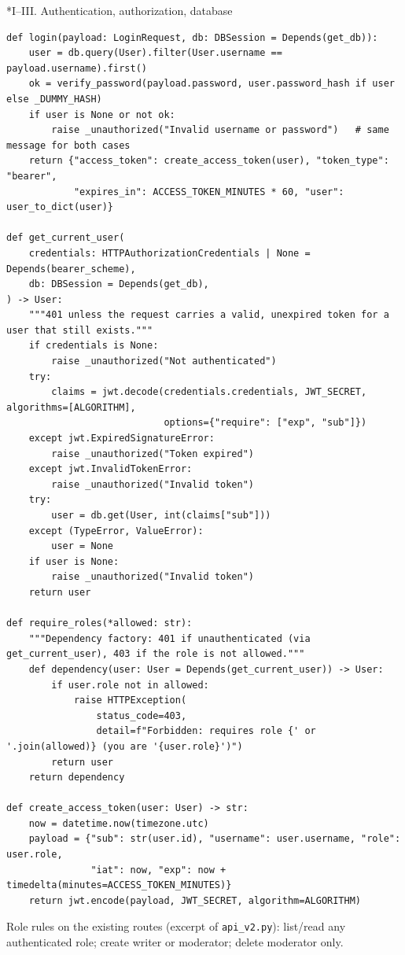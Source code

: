 \documentclass[11pt]{article}
\makeatletter
\renewcommand\subsection{\@startsection{subsection}{2}{\z@}{-2.2ex \@plus -1ex \@minus -.2ex}{0.8ex \@plus.2ex}{\normalfont\fontsize{12}{14.5}\selectfont\bfseries}}
\makeatother
\begin{document}
\subsection*{I--III. Authentication, authorization, database}
\begingroup\lstset{basicstyle=\ttfamily\scriptsize}
\begin{lstlisting}
def login(payload: LoginRequest, db: DBSession = Depends(get_db)):
    user = db.query(User).filter(User.username == payload.username).first()
    ok = verify_password(payload.password, user.password_hash if user else _DUMMY_HASH)
    if user is None or not ok:
        raise _unauthorized("Invalid username or password")   # same message for both cases
    return {"access_token": create_access_token(user), "token_type": "bearer",
            "expires_in": ACCESS_TOKEN_MINUTES * 60, "user": user_to_dict(user)}

def get_current_user(
    credentials: HTTPAuthorizationCredentials | None = Depends(bearer_scheme),
    db: DBSession = Depends(get_db),
) -> User:
    """401 unless the request carries a valid, unexpired token for a user that still exists."""
    if credentials is None:
        raise _unauthorized("Not authenticated")
    try:
        claims = jwt.decode(credentials.credentials, JWT_SECRET, algorithms=[ALGORITHM],
                            options={"require": ["exp", "sub"]})
    except jwt.ExpiredSignatureError:
        raise _unauthorized("Token expired")
    except jwt.InvalidTokenError:
        raise _unauthorized("Invalid token")
    try:
        user = db.get(User, int(claims["sub"]))
    except (TypeError, ValueError):
        user = None
    if user is None:
        raise _unauthorized("Invalid token")
    return user

def require_roles(*allowed: str):
    """Dependency factory: 401 if unauthenticated (via get_current_user), 403 if the role is not allowed."""
    def dependency(user: User = Depends(get_current_user)) -> User:
        if user.role not in allowed:
            raise HTTPException(
                status_code=403,
                detail=f"Forbidden: requires role {' or '.join(allowed)} (you are '{user.role}')")
        return user
    return dependency

def create_access_token(user: User) -> str:
    now = datetime.now(timezone.utc)
    payload = {"sub": str(user.id), "username": user.username, "role": user.role,
               "iat": now, "exp": now + timedelta(minutes=ACCESS_TOKEN_MINUTES)}
    return jwt.encode(payload, JWT_SECRET, algorithm=ALGORITHM)
\end{lstlisting}
\endgroup
Role rules on the existing routes (excerpt of \texttt{api\_\allowbreak{}v2.py}): list/read any authenticated role; create writer or moderator; delete moderator only.
\end{document}
